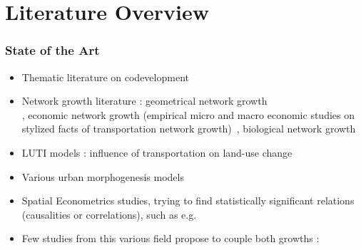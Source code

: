 \section{Literature Overview}




\begin{frame}
\frametitle{State of the Art}

\begin{itemize}
\vfill{}
\item \begin{justify}Thematic literature on codevelopment\\
\cite{bretagnolle:tel-00459720,l2012ville}
\end{justify}
\vfill{}
\item \begin{justify}Network growth literature : geometrical network growth\\\cite{barthelemy2008modeling}, economic network growth (empirical micro and macro economic studies on stylized facts of transportation network growth)~\cite{xie2009modeling}, biological network growth~\cite{adamatzky2010road,TeroAl10}
\end{justify}
\vfill{}
\item \begin{justify}LUTI models : influence of transportation on land-use change~\cite{chang2006models,iacono2008models}\end{justify}
\vfill{}
\item \begin{justify}Various urban morphogenesis models~\cite{achibet2014model,bonin2012modele}\end{justify}
\vfill{}
\item \begin{justify}Spatial Econometrics studies, trying to find statistically significant relations (causalities or correlations), such as e.g.~\cite{duranton2012urban,levinson2008density}\end{justify}
\vfill{}
\item \begin{justify}Few studies from this various field propose to couple both growths : \cite{barthelemy2009co,achibet2014model,raimbault2014hybrid,levinson2007co}\end{justify}
\vfill{}
\end{itemize}

\end{frame}








